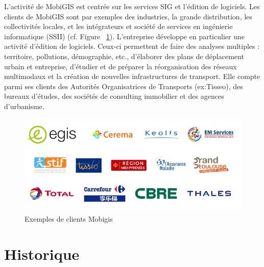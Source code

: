 L'activité de MobiGIS est centrée sur les services SIG et l'édition de logiciels. Les clients de MobiGIS sont par exemples des industries, la grande distribution, les collectivités locales, et les intégrateurs et société de services en ingénierie informatique (SSII) (cf. Figure ~\ref{fig:Exemples de clients}). L’entreprise développe en particulier une activité d’édition de logiciels. Ceux-ci permettent de faire des analyses multiples : territoire, pollutions, démographie, etc., d’élaborer des plans de déplacement urbain et entreprise, d’étudier et de préparer la réorganisation des réseaux multimodaux et la création de nouvelles infrastructures de transport. Elle compte parmi ses clients des Autorités Organisatrices de Transports (ex:Tisseo), des bureaux d’études, des sociétés de consulting immobilier et des agences d’urbanisme.\\

\begin{figure}[!h]\label{fig:Exemples de clients}
\centering
\includegraphics[width=12cm]{images/fig2_referencesMobigis.JPG}
\caption{Exemples de clients Mobigis}
\end{figure} 

\section{Historique}

